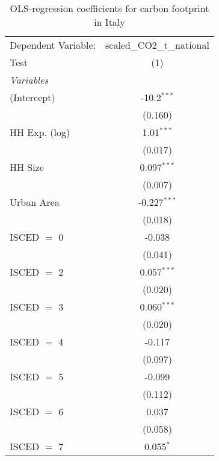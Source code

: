 
\begin{table}[htbp!]
   \centering
   \small
   \begin{adjustbox}{width = 1\textwidth, max height = 0.95\textheight, center}
      \begin{threeparttable}[b]
         \caption{\label{tab:OLS_2_ITA} OLS-regression coefficients for carbon footprint in Italy}
         \begin{tabular}{lc}
            \tabularnewline \midrule \midrule
            Dependent Variable: & scaled\_CO2\_t\_national\\     
            Test                & (1)\\  
            \midrule
            \emph{Variables}\\
            (Intercept)         & -10.2$^{***}$\\   
                                & (0.160)\\   
            HH Exp. (log)       & 1.01$^{***}$\\   
                                & (0.017)\\   
            HH Size             & 0.097$^{***}$\\   
                                & (0.007)\\   
            Urban Area          & -0.227$^{***}$\\   
                                & (0.018)\\   
            ISCED $=$ 0         & -0.038\\   
                                & (0.041)\\   
            ISCED $=$ 2         & 0.057$^{***}$\\   
                                & (0.020)\\   
            ISCED $=$ 3         & 0.060$^{***}$\\   
                                & (0.020)\\   
            ISCED $=$ 4         & -0.117\\   
                                & (0.097)\\   
            ISCED $=$ 5         & -0.099\\   
                                & (0.112)\\   
            ISCED $=$ 6         & 0.037\\   
                                & (0.058)\\   
            ISCED $=$ 7         & 0.055$^{*}$\\   

\end{tabular}
\end{threeparttable}
\end{adjustbox}
\end{table}
